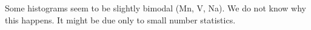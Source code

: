 \documentclass[dvips,12pt,a4paper]{report}
\begin{document}
{{Some histograms seem to be slightly bimodal (Mn, V, Na). We do not know why this happens. It might be due only to small number statistics.









}}
\end{document}

